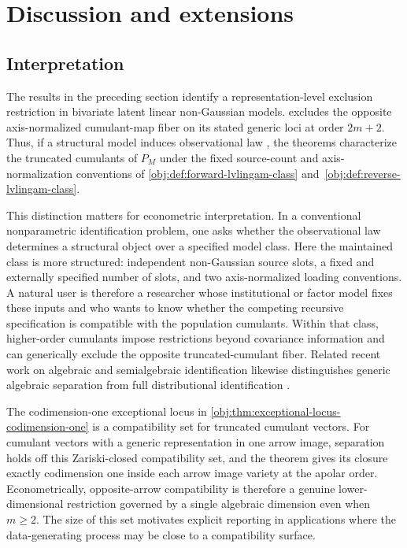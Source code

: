 \section{Discussion and extensions}

\subsection{Interpretation}

The results in the preceding section identify a representation-level exclusion restriction in bivariate latent linear non-Gaussian models.  excludes the opposite axis-normalized cumulant-map fiber on its stated generic loci at order \(2m+2\). Thus, if a structural model  induces observational law , the theorems characterize the truncated cumulants of \(P_M\) under the fixed source-count and axis-normalization conventions of \cref{obj:def:forward-lvlingam-class} and~\cref{obj:def:reverse-lvlingam-class}.

This distinction matters for econometric interpretation. In a conventional nonparametric identification problem, one asks whether the observational law determines a structural object over a specified model class. Here the maintained class is more structured: independent non-Gaussian source slots, a fixed and externally specified number of slots, and two axis-normalized loading conventions. A natural user is therefore a researcher whose institutional or factor model fixes these inputs and who wants to know whether the competing recursive specification is compatible with the population cumulants. Within that class, higher-order cumulants impose restrictions beyond covariance information and can generically exclude the opposite truncated-cumulant fiber. Related recent work on algebraic and semialgebraic identification likewise distinguishes generic algebraic separation from full distributional identification \citep{MestersZwiernik2022,Virolainen2024}.

The codimension-one exceptional locus in \cref{obj:thm:exceptional-locus-codimension-one} is a compatibility set for truncated cumulant vectors. For cumulant vectors with a generic representation in one arrow image, separation holds off this Zariski-closed compatibility set, and the theorem gives its closure exactly codimension one inside each arrow image variety at the apolar order. Econometrically, opposite-arrow compatibility is therefore a genuine lower-dimensional restriction governed by a single algebraic dimension even when \(m\ge2\). The size of this set motivates explicit reporting in applications where the data-generating process may be close to a compatibility surface.

